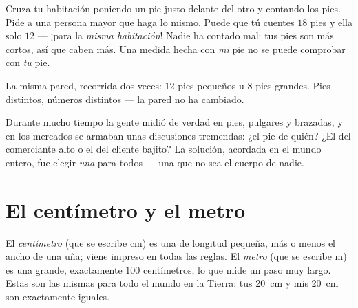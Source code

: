 \begin{example}\label{ex:g2:measuring-length:pace}
Cruza tu habitación poniendo un pie justo delante del otro y contando
los pies. Pide a una persona mayor que haga lo mismo. Puede que tú
cuentes $18$ pies y ella solo $12$ --- ¡para la \emph{misma
habitación}! Nadie ha contado mal: tus pies son más cortos, así que
caben más. Una medida hecha con \emph{mi} pie no se puede comprobar
con \emph{tu} pie.
\end{example}

\begin{omfigure}

{\small La misma pared, recorrida dos veces: $12$ pies pequeños u $8$
pies grandes. Pies distintos, números distintos --- la pared no ha
cambiado.}
\end{omfigure}

\begin{remark}\label{rem:g2:measuring-length:argument}
Durante mucho tiempo la gente midió de verdad en pies, pulgares y
brazadas, y en los mercados se armaban unas discusiones tremendas:
¿el pie de quién? ¿El del comerciante alto o el del cliente bajito? La
solución, acordada en el mundo entero, fue elegir \emph{una} 
para todos --- una  que no sea el cuerpo de nadie.
\end{remark}

\section{El centímetro y el metro}

\begin{definition}\label{def:g2:measuring-length:units}
El \emph{centímetro} (que se escribe \unit{cm}) es
una  de longitud pequeña, más o menos el ancho de una uña;
viene impreso en todas las reglas. El \emph{metro} (que
se escribe \unit{m}) es una  grande, exactamente $100$
centímetros, lo que mide un paso muy largo. Estas  son las
mismas para todo el mundo en la Tierra: tus \qty{20}{cm} y mis
\qty{20}{cm} son exactamente iguales.
\end{definition}

